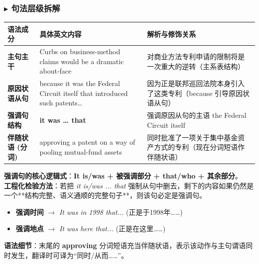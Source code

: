 \documentclass[cn,normal,11pt]{elegantnote}
\begin{document}
\subsubsection*{$\blacktriangleright$ 句法层级拆解}
\noindent
\begin{tabularx}{\textwidth}{p{3.2cm} X X}
  \toprule
  \textbf{语法成分} & \textbf{具体英文内容} & \textbf{解析与修饰关系} \\
  \midrule
  \textbf{主句主干} & Curbs on business-method claims would be a dramatic about-face & 对商业方法专利申请的限制将是一次重大的逆转（主系表结构） \\
  \midrule
  \textbf{原因状语从句} & because it was the Federal Circuit itself that introduced such patents… & 因为正是联邦巡回法院本身引入了这类专利（because 引导原因状语从句） \\
  \midrule
  \textbf{强调句结构} & \textbf{it was … that} & 强调原因从句的主语 the Federal Circuit itself \\
  \midrule
  \textbf{伴随状语 (分词)} & approving a patent on a way of pooling mutual-fund assets & 同时批准了一项关于集中基金资产方式的专利（现在分词短语作伴随状语） \\
  \bottomrule
\end{tabularx}

\begin{proposition}[强调句结构的精准判定]
  \textbf{强调句的核心逻辑式}：\textbf{It is/was + 被强调部分 + that/who + 其余部分}。\\
  \textbf{工程化检验方法}：若把 \textit{it is/was ... that} 强制从句中删去，剩下的内容如果仍然是一个**结构完整、语义通顺的完整句子**，则该句必定是强调句。
  \begin{itemize}
    \item \textbf{强调时间} $\rightarrow$ \textit{It was in 1998 that...} (正是于1998年……)
    \item \textbf{强调地点} $\rightarrow$ \textit{It was here that...} (正是在这里……)
  \end{itemize}
  \textbf{语法细节}：末尾的 \textbf{approving} 分词短语充当伴随状语，表示该动作与主句谓语同时发生，翻译时可译为“同时/从而……”。
\end{proposition}
\end{document}
